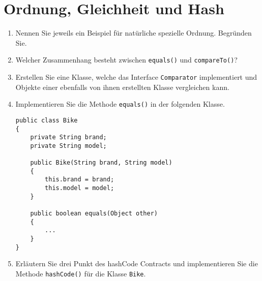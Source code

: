 \newpage
\section{Ordnung, Gleichheit und Hash}
\begin{enumerate}
    \item Nennen Sie jeweils ein Beispiel für natürliche spezielle Ordnung. 
        Begründen Sie. 
    \item Welcher Zusammenhang besteht zwischen \verb?equals()? und \verb?compareTo()?? 
    \item Erstellen Sie eine Klasse, welche das Interface \verb?Comparator? 
        implementiert und Objekte einer ebenfalls von ihnen erstellten Klasse 
        vergleichen kann. 
    \item Implementieren Sie die Methode \verb?equals()? in der folgenden 
        Klasse. 
        \begin{lstlisting}
public class Bike 
{
    private String brand;
    private String model;

    public Bike(String brand, String model) 
    {
        this.brand = brand;
        this.model = model;
    }

    public boolean equals(Object other)
    {
        ...
    }
}
        \end{lstlisting}
    \item Erläutern Sie drei Punkt des hashCode Contracts und implementieren 
        Sie die Methode \verb?hashCode()? für die Klasse \verb?Bike?. 
\end{enumerate}

